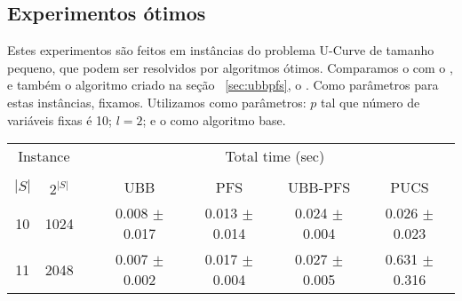 \subsection{Experimentos ótimos}
Estes experimentos são feitos em instâncias do problema U-Curve de 
tamanho pequeno, que podem ser resolvidos por algoritmos ótimos. 
Comparamos o  com o ,  e
também o algoritmo criado na seção ~\ref{sec:ubbpfs}, o 
. Como parâmetros para estas instâncias, fixamos. 
Utilizamos como parâmetros: $p$ tal que número de variáveis fixas é 10;
$l = 2$; e o  como algoritmo base.

\begin{table}
\centering
\footnotesize
\begin{tabular}{cc c cccc}
\toprule
\multicolumn{2}{c}{Instance} & \phantom{} & \multicolumn{4}{c}{Total time (sec)} \\
\cline{1-2}\cline{4-7}\\
$|S|$ & $2^{|S|}$ && UBB & PFS & UBB-PFS & PUCS \\
10 &    1024 &&  0.008 $\pm$ 0.017 & 0.013 $\pm$ 0.014 & 0.024 $\pm$ 0.004 & 0.026 $\pm$ 0.023 \\
11 &    2048 &&  0.007 $\pm$ 0.002 & 0.017 $\pm$ 0.004 & 0.027 $\pm$ 0.005 & 0.631 $\pm$ 0.316 \\

\end{tabular}
\end{table}

